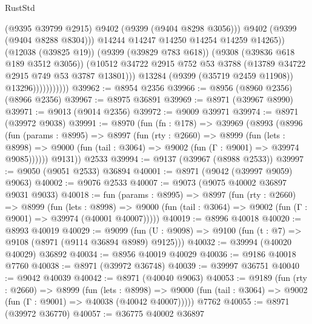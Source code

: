 \begin{lexlean}{RustStd}
\begin{coremodule}
                                    (@9395 @39799 @2915)
                                    @9402
                                    (@9399 (@9404 @8298 @3056)))
                                  @9402
                                  (@9399 (@9404 @8288 @8304)))
                                @14244
                                @14247
                                @14250
                                @14254
                                @14259
                                @14265))
                            (@12038 (@39825 @19))
                            (@9399 (@39829 @783 @618))
                            (@9308 (@39836 @618 @189 @3512 @3056))
                            (@10512
                              @34722
                              @2915
                              @752
                              @53
                              @3788
                              (@13789 @34722 @2915 @749 @53 @3787 @13801)))
                          @13284
                          (@9399 (@35719 @2459 @11908))
                          @13296)))))))))))
@39962 := @8954 @2356
@39966 := @8956 (@8960 @2356) (@8966 @2356)
@39967 := @8975 @36891
@39969 := @8971 (@39967 @8990)
@39971 := @9013 (@9014 @2356)
@39972 := @9009 @39971
@39974 := @8971 (@39972 @9038)
@39991 := @8970
    (fun (fn : @178) =>
    @39969
      (@8993
        (@8996
          (fun (params : @8995) =>
          @8997
            (fun (rty : @2660) =>
            @8999
              (fun (lets : @8998) =>
              @9000 (fun (tail : @3064) => @9002 (fun (Γ : @9001) => @39974 @9085))))))
        @9131))
    @2533
@39994 := @9137 (@39967 (@8988 @2533))
@39997 := @9050 (@9051 @2533) @36894
@40001 := @8971 (@9042 (@39997 @9059) @9063)
@40002 := @9076 @2533
@40007 := @9073 (@9075 @40002 @36897 @9031 @9033)
@40018 := fun (params : @8995) =>
  @8997
    (fun (rty : @2660) =>
    @8999
      (fun (lets : @8998) =>
      @9000 (fun (tail : @3064) => @9002 (fun (Γ : @9001) => @39974 (@40001 @40007)))))
@40019 := @8996 @40018
@40020 := @8993 @40019
@40029 := @9099
    (fun (U : @9098) => @9100 (fun (t : @7) => @9108 (@8971 (@9114 @36894 @8989) @9125)))
@40032 := @39994 (@40020 @40029) @36892
@40034 := @8956 @40019 @40029
@40036 := @9186 @40018 @7760
@40038 := @8971 (@39972 @36748)
@40039 := @39997 @36751
@40040 := @9042 @40039
@40042 := @8971 (@40040 @9063)
@40053 := @9189
    (fun (rty : @2660) =>
    @8999
      (fun (lets : @8998) =>
      @9000 (fun (tail : @3064) => @9002 (fun (Γ : @9001) => @40038 (@40042 @40007)))))
    @7762
@40055 := @8971 (@39972 @36770)
@40057 := @36775 @40002 @36897

\end{coremodule}
\end{lexlean}
